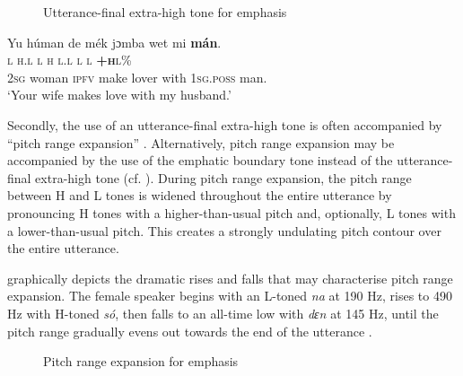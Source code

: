 \begin{figure}
\caption{Utterance-final extra-high tone for emphasis}
\label{fig:key:3.25}
\end{figure}
 


\ea%
    \label{ex:key:64}
    \glll   Yu  húman  de  mék    jɔmba  wet  mi    \textbf{mán}.\\
\textsc{l}  \textsc{h.l}    \textsc{l}  \textsc{h}    \textsc{l.l}    \textsc{l}  \textsc{l}    \textbf{\textsc{+h}}\textsc{l\%}\\
\textsc{2sg}  woman  \textsc{ipfv}  make  lover  with  \textsc{1sg.poss}  man.\\
\glt ‘Your wife makes love with my husband.’
\z

Secondly, the use of an utterance-final extra-high tone is often accompanied by “pitch range expansion” \citep[276]{Yip2002}. Alternatively, pitch range expansion may be accompanied by the use of the emphatic boundary tone instead of the utterance-final extra-high tone (cf. ). During pitch range expansion, the pitch range between H and L tones is widened throughout the entire utterance by pronouncing H tones with a higher-than-usual pitch and, optionally, L tones with a lower-than-usual pitch. This creates a strongly undulating pitch contour over the entire utterance.

 graphically depicts the dramatic rises and falls that may characterise pitch range expansion. The female speaker begins with an L-toned \textit{na} at 190 Hz, rises to 490 Hz with H-toned \textit{só}, then falls to an all-time low with \textit{dɛn} at 145 Hz, until the pitch range gradually evens out towards the end of the utterance .

\begin{figure}
\caption{Pitch range expansion for emphasis}
\label{fig:key:3.26}
\end{figure}
 


